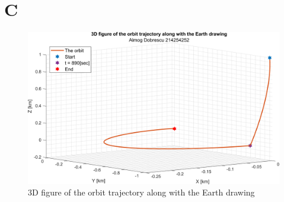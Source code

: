 \documentclass[11pt, a4paper]{article}
\begin{document}
\section{C}
\begin{figure}[H]
    \centering
    \includegraphics[width=\textwidth]{images/3D plot.png}
    \caption{3D figure of the orbit trajectory along with the Earth drawing}
    \label{fig:3D-plot}
\end{figure}
\end{document}
